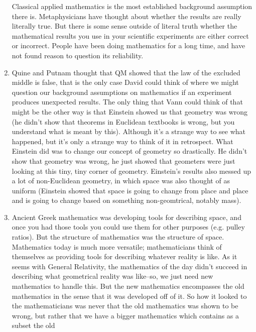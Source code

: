\documentclass[12pt]{article}
\theoremstyle{definition}
\begin{document}
\begin{enumerate}
        Classical applied mathematics is the most established background
        assumption there is. Metaphysicians have thought about whether the
        results are really literally true. But there is some sense outside of
        literal truth whether the mathematical results you use in your
        scientific experiments are either correct or incorrect. People have
        been doing mathematics for a long time, and have not found reason to
        question its reliability.
    \item
        Quine and Putnam thought that QM showed that the law of the excluded
        middle is false, that is the only case David could think of where we
        might question our background assumptions on mathematics if an
        experiment produces unexpected results. The only thing that Vann could
        think of that might be the other way is that Einstein showed us that
        geometry was wrong (he didn't show that theorems in Euclidean textbooks
        is wrong, but you understand what is meant by this). Although it's a
        strange way to see what happened, but it's only a strange way to think
        of it in retrospect. What Einstein did was to change our concept of
        geometry so drastically. He didn't show that geometry was wrong, he
        just showed that geometers were just looking at this tiny, tiny corner
        of geometry. Einstein's results also messed up a lot of non-Euclidean
        geometry, in which space was also thought of as uniform (Einstein
        showed that space is going to change from place and place and is going
        to change based on something non-geomtrical, notably mass).
    \item
        Ancient Greek mathematics was developing tools for describing space,
        and once you had those tools you could use them for other purposes
        (e.g. pulley ratios). But the structure of mathematics was the
        structure of space. Mathematics today is much more versatile;
        mathematicians think of themselves as providing tools for describing
        whatever reality is like. As it seems with General Relativity, the
        mathematics of the day didn't succeed in describing what geometrical
        reality was like--so, we just need new mathematics to handle this. But
        the new mathematics encompasses the old mathematics in the sense that
        it was developed off of it. So how it looked to the mathematicians was
        never that the old mathematics was shown to be wrong, but rather that
        we have a bigger mathematics which contains as a subset the old

\end{enumerate}
\end{document}

